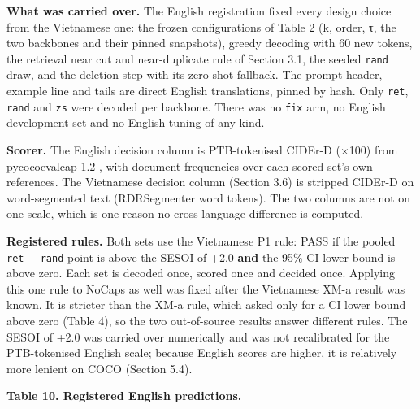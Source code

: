 \textbf{What was carried over.} The English registration fixed every design choice from the
Vietnamese one: the frozen configurations of Table 2 (k, order, τ, the two backbones and their
pinned snapshots), greedy decoding with 60 new tokens, the retrieval near cut and near-duplicate
rule of Section 3.1, the seeded \texttt{rand} draw, and the deletion step with its zero-shot
fallback. The prompt header, example line and tails are direct English translations, pinned by hash.
Only \texttt{ret}, \texttt{rand} and \texttt{zs} were decoded per backbone. There was no
\texttt{fix} arm, no English development set and no English tuning of any kind.

\textbf{Scorer.} The English decision column is PTB-tokenised CIDEr-D (×100) from pycocoevalcap 1.2
\citep{Chen2015COCOCaptions}, with document frequencies over each scored set's own references. The
Vietnamese decision column (Section 3.6) is stripped CIDEr-D on word-segmented text (RDRSegmenter
word tokens). The two columns are not on one scale, which is one reason no cross-language difference
is computed.

\textbf{Registered rules.} Both sets use the Vietnamese P1 rule: PASS if the pooled \texttt{ret} −
\texttt{rand} point is above the SESOI of +2.0 \textbf{and} the 95\% CI lower bound is above zero.
Each set is decoded once, scored once and decided once. Applying this one rule to NoCaps as well was
fixed after the Vietnamese XM-a result was known. It is stricter than the XM-a rule, which asked
only for a CI lower bound above zero (Table 4), so the two out-of-source results answer different
rules. The SESOI of +2.0 was carried over numerically and was not recalibrated for the PTB-tokenised
English scale; because English scores are higher, it is relatively more lenient on COCO (Section
5.4).

\textbf{Table 10. Registered English predictions.}

